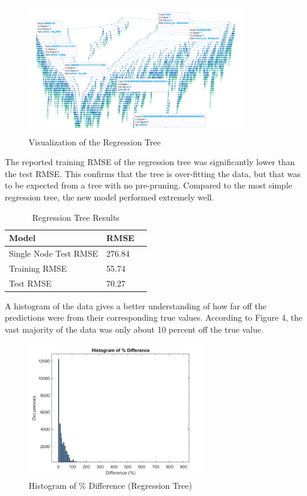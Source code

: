 \documentclass{article}
\begin{document}
\begin{figure}[ht]
\caption{Visualization of the Regression Tree}
\centering
\includegraphics[width=0.85\textwidth]{Fig3}
\end{figure}

The reported training RMSE of the regression tree was significantly lower than the test RMSE. This confirms that the tree is over-fitting the data, but that was to be expected from a tree with no pre-pruning. Compared to the most simple regression tree, the new model performed extremely well.

\begin{table}[ht]
  \caption{Regression Tree Results}
  \label{sample-table}
  \centering
  \begin{tabular}{lll}
    \toprule
    Model     & RMSE \\
    \midrule
    Single Node Test RMSE   &  276.84     \\
    Training RMSE       & 55.74       \\
    Test RMSE           & 70.27      \\

    \bottomrule
  \end{tabular}
\end{table}

A histogram of the data gives a better understanding of how far off the predictions were from their corresponding true values. According to Figure 4, the vast majority of the data was only about 10 percent off the true value.

\begin{figure}[ht]
\caption{Histogram of \% Difference (Regression Tree)}
\centering
\includegraphics[width=0.7\textwidth]{Fig4}
\end{figure}
\end{document}
